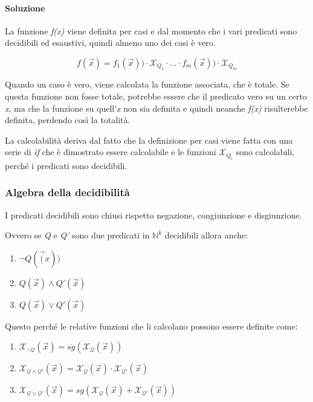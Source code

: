 \paragraph{Soluzione}\label{soluzione-esercizio}

La funzione \emph{f(x)} viene definita per casi e dal momento che i vari
predicati sono decidibili ed esaustivi, quindi almeno uno dei casi è
vero.

$$
f(\vec{x}) = f_1(\vec{x}))\cdot \mathcal{X}_{Q_1} \cdot \ldots \cdot f_m(\vec{x}))\cdot \mathcal{X}_{Q_m}
$$

Quando un caso è vero, viene calcolata la funzione associata, che è
totale. Se questa funzione non fosse totale, potrebbe essere che il
predicato vero su un certo \emph{x}, ma che la funzione su
quell'\emph{x} non sia definita e quindi neanche \emph{f(x)}
risulterebbe definita, perdendo così la totalità.

La calcolabilità deriva dal fatto che la definizione per casi viene
fatta con una serie di \emph{if} che è dimostrato essere calcolabile e
le funzioni $\mathcal{X}_{Q_i}$ sono calcolabili, perché i predicati sono
decidibili.

\subsubsection{Algebra della decidibilità}\label{algebra-della-decibilituxe0}

I predicati decidibili sono chiusi rispetto negazione, congiunzione e
disgiunzione.

Ovvero se \textit{Q} e \textit{Q'} sono due predicati in $\mathbb{N}^k$ decidibili allora anche:

\begin{enumerate}
\item $\neg Q(\vec(x))$
\item $ Q(\vec{x}) \wedge Q'(\vec{x})$
\item $ Q(\vec{x}) \vee Q'(\vec{x}) $
\end{enumerate}

Questo perché le relative funzioni che li calcolano possono essere definite come:

\begin{enumerate}
	\item $ \mathcal{X_{\neg Q}}(\vec{x}) = \overline{sg}( \mathcal{X_{Q}}(\vec{x})) $
	\item $ \mathcal{X_{Q \wedge Q'}}(\vec{x})= \mathcal{X_{Q}}(\vec{x}) \cdot \mathcal{X_{Q'}}(\vec{x})$
	\item $ \mathcal{X_{Q \vee Q'}}(\vec{x})= sg(\mathcal{X_{Q}}(\vec{x}) + \mathcal{X_{Q'}}(\vec{x}))$
\end{enumerate}

